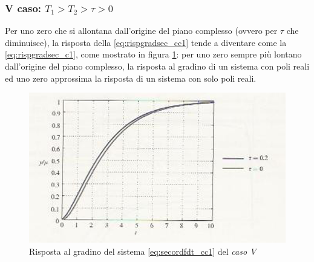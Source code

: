 \documentclass[a4paper]{report}
\begin{document}
\subsubsection{V caso: $T_1 > T_2 > \tau > 0$}
Per uno zero che si allontana dall'origine del piano complesso (ovvero
per $\tau$ che diminuisce), la risposta della \ref{eq:rispgradsec_cc1}
tende a diventare come la \ref{eq:rispgradsec_c1}, come mostrato in
figura \ref{fig:risp7}: per uno zero sempre pi\`u lontano dall'origine
del piano complesso, la risposta al gradino di un sistema con poli
reali ed uno zero approssima la risposta di un sistema con solo poli
reali. 
\begin{figure}[!h]
\begin{center}
\includegraphics[scale=0.5]{./figures/rispscal7.png}
\caption{Risposta al gradino del sistema \ref{eq:secordfdt_cc1} del
  \emph{caso V}}\label{fig:risp7} 
\end{center}
\end{figure} 
\end{document}
